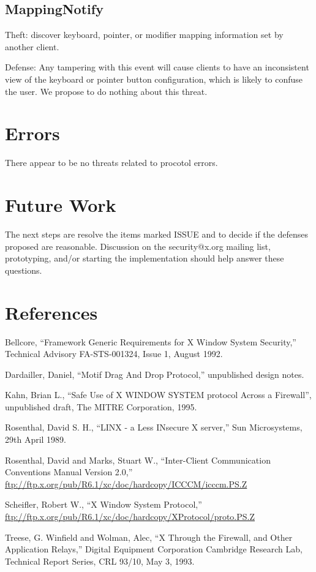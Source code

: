 \documentclass{article}
\begin{document}
\subsection{MappingNotify}

Theft: discover keyboard, pointer, or modifier mapping information
set by another client.

Defense: Any tampering with this event will cause clients to have an
inconsistent view of the keyboard or pointer button configuration,
which is likely to confuse the user.  We propose to do nothing about
this threat.


\section{Errors}

There appear to be no threats related to procotol errors.



\section{Future Work}

The next steps are resolve the items marked ISSUE and to decide if the
defenses proposed are reasonable.  Discussion on the security@x.org
mailing list, prototyping, and/or starting the implementation should
help answer these questions.



\section{References}

Bellcore, ``Framework Generic Requirements for X Window System Security,''
Technical Advisory FA-STS-001324, Issue 1, August 1992.

Dardailler, Daniel, ``Motif Drag And Drop Protocol,'' unpublished
design notes.

Kahn, Brian L., ``Safe Use of X WINDOW SYSTEM protocol Across a
Firewall'', unpublished draft, The MITRE Corporation, 1995.

Rosenthal, David S. H., ``LINX - a Less INsecure X server,'' Sun Microsystems,
29th April 1989.

Rosenthal, David and Marks, Stuart W., ``Inter-Client Communication
Conventions Manual Version 2.0,''
\url{ftp://ftp.x.org/pub/R6.1/xc/doc/hardcopy/ICCCM/icccm.PS.Z}

Scheifler, Robert W., ``X Window System Protocol,''
\url{ftp://ftp.x.org/pub/R6.1/xc/doc/hardcopy/XProtocol/proto.PS.Z}

Treese, G. Winfield and Wolman, Alec, ``X Through the Firewall, and
Other Application Relays,'' Digital Equipment Corporation Cambridge
Research Lab, Technical Report Series, CRL 93/10, May 3, 1993.
\end{document}
